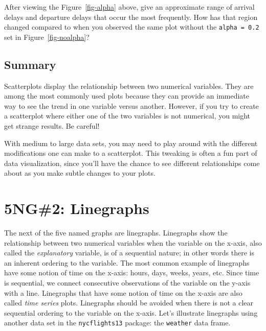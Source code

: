 \documentclass[
  letterpaper,
  DIV=11,
  numbers=noendperiod]{scrreprt}
\theoremstyle{definition}
\theoremstyle{remark}
\begin{document}
\begin{tcolorbox}[enhanced jigsaw, coltitle=black, toprule=.15mm, bottomtitle=1mm, breakable, leftrule=.75mm, title={{🎯} Learning Check 2.8}, opacitybacktitle=0.6, colback=white, rightrule=.15mm, opacityback=0, toptitle=1mm, colbacktitle=quarto-callout-tip-color!10!white, colframe=quarto-callout-tip-color-frame, titlerule=0mm, arc=.35mm, bottomrule=.15mm, left=2mm]
After viewing the Figure~\ref{fig-alpha} above, give an approximate
range of arrival delays and departure delays that occur the most
frequently. How has that region changed compared to when you observed
the same plot without the \texttt{alpha\ =\ 0.2} set in
Figure~\ref{fig-noalpha}?
\end{tcolorbox}

\hypertarget{summary}{%
\subsection{Summary}\label{summary}}

Scatterplots display the relationship between two numerical variables.
They are among the most commonly used plots because they can provide an
immediate way to see the trend in one variable versus another. However,
if you try to create a scatterplot where either one of the two variables
is not numerical, you might get strange results. Be careful!

With medium to large data sets, you may need to play around with the
different modifications one can make to a scatterplot. This tweaking is
often a fun part of data visualization, since you'll have the chance to
see different relationships come about as you make subtle changes to
your plots.

\hypertarget{sec-linegraphs}{%
\section{5NG\#2: Linegraphs}\label{sec-linegraphs}}

The next of the five named graphs are linegraphs. Linegraphs show the
relationship between two numerical variables when the variable on the
x-axis, also called the \emph{explanatory} variable, is of a sequential
nature; in other words there is an inherent ordering to the variable.
The most common example of linegraphs have some notion of time on the
x-axis: hours, days, weeks, years, etc. Since time is sequential, we
connect consecutive observations of the variable on the y-axis with a
line. Linegraphs that have some notion of time on the x-axis are also
called \emph{time series} plots. Linegraphs should be avoided when there
is not a clear sequential ordering to the variable on the x-axis. Let's
illustrate linegraphs using another data set in the
\texttt{nycflights13} package: the \texttt{weather} data frame.
\end{document}

